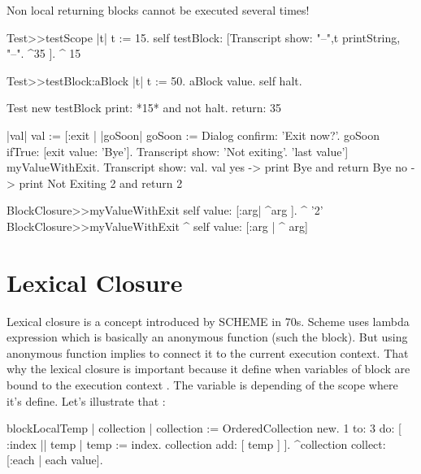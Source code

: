 \documentclass[a4paper,10pt,twoside]{book}
\begin{document}
Non local returning blocks cannot be executed several times!

\begin{code}{}
Test>>testScope
	   |t|
    	t := 15.
	   self testBlock: [Transcript show: "--",t printString, "--".
	   ^35 ].
    ^ 15

Test>>testBlock:aBlock
	   |t|
	   t := 50.
	   aBlock value.
	   self halt.
\end{code}

\begin{code}{}
Test new testBlock 	
print: *15* and not halt. 
return: 35
\end{code}


\begin{code}{}
|val|
val := [:exit |
		|goSoon|
		goSoon := Dialog confirm: 'Exit now?'.
		goSoon ifTrue: [exit value: 'Bye'].
		Transcript show: 'Not exiting'.
		'last value'] myValueWithExit.
Transcript show: val.
val
yes -> print Bye and return  Bye
no -> print Not Exiting 2 and return 2
\end{code}

\begin{code}{}
BlockClosure>>myValueWithExit
	      self value: [:arg| ^arg ].
      ^ '2'
BlockClosure>>myValueWithExit
 ^ self value: [:arg | ^ arg]        
\end{code}


\section{Lexical Closure}


Lexical closure is a concept introduced by SCHEME in 70s. Scheme uses lambda expression which is basically an anonymous function (such the block). But using anonymous function implies to connect it to the current execution context. That why the lexical closure is important because it define when variables of block are bound to the execution context . The variable is depending of the scope where it's  define. Let's illustrate that :

\begin{code}{}
blockLocalTemp
	| collection |
		collection := OrderedCollection new.
		1 to: 3 do: [ :index || temp |
			temp := index. 
			collection add: [ temp ] ].
		^collection collect: [:each | each value].
\end{code}
\end{document}
